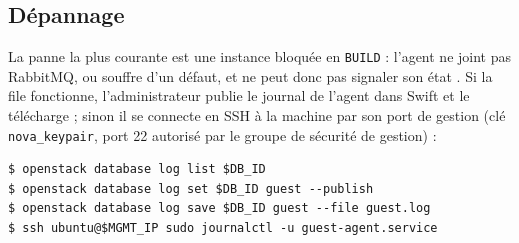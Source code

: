\subsection{Dépannage}\label{sec:tr-pannes}

La panne la plus courante est une instance bloquée en \texttt{BUILD} : l'agent ne joint pas RabbitMQ, ou souffre d'un défaut, et ne peut
donc pas signaler son état \parencite{trove-troubleshooting}. Si la file fonctionne, l'administrateur publie le journal de l'agent dans
Swift et le télécharge ; sinon il se connecte en SSH à la machine par son port de gestion (clé \texttt{nova\_keypair}, port 22 autorisé par
le groupe de sécurité de gestion) :

\par\noindent\begin{minipage}{\linewidth}
\begin{lstlisting}[style=terminal]
$ openstack database log list $DB_ID
$ openstack database log set $DB_ID guest --publish
$ openstack database log save $DB_ID guest --file guest.log
$ ssh ubuntu@$MGMT_IP sudo journalctl -u guest-agent.service
\end{lstlisting}
\end{minipage}\par

